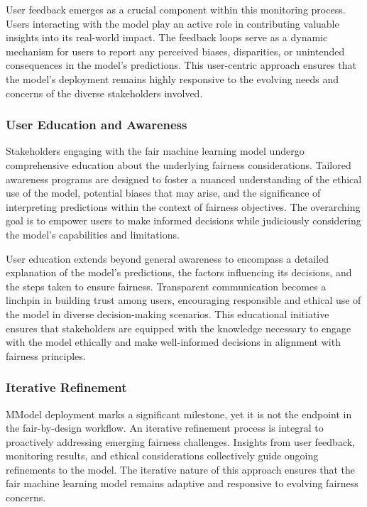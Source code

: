 User feedback emerges as a crucial component within this monitoring process. Users interacting with the model play an active role in contributing valuable insights into its real-world impact. The feedback loops serve as a dynamic mechanism for users to report any perceived biases, disparities, or unintended consequences in the model's predictions. This user-centric approach ensures that the model's deployment remains highly responsive to the evolving needs and concerns of the diverse stakeholders involved.

\subsubsection{User Education and Awareness}

Stakeholders engaging with the fair machine learning model undergo comprehensive education about the underlying fairness considerations. Tailored awareness programs are designed to foster a nuanced understanding of the ethical use of the model, potential biases that may arise, and the significance of interpreting predictions within the context of fairness objectives. The overarching goal is to empower users to make informed decisions while judiciously considering the model's capabilities and limitations.

User education extends beyond general awareness to encompass a detailed explanation of the model's predictions, the factors influencing its decisions, and the steps taken to ensure fairness. Transparent communication becomes a linchpin in building trust among users, encouraging responsible and ethical use of the model in diverse decision-making scenarios. This educational initiative ensures that stakeholders are equipped with the knowledge necessary to engage with the model ethically and make well-informed decisions in alignment with fairness principles.

\subsubsection{Iterative Refinement}

MModel deployment marks a significant milestone, yet it is not the endpoint in the fair-by-design workflow. An iterative refinement process is integral to proactively addressing emerging fairness challenges. Insights from user feedback, monitoring results, and ethical considerations collectively guide ongoing refinements to the model. The iterative nature of this approach ensures that the fair machine learning model remains adaptive and responsive to evolving fairness concerns.


